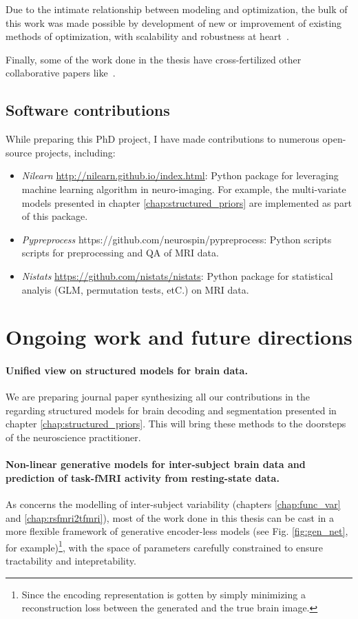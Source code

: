 Due to the intimate relationship between modeling and optimization, the
bulk of this work was made possible by development of new or improvement of existing methods of
optimization, with scalability and robustness at heart~\citep{dohmatob2014benchmarking,dohmatob2015local,varoquaux2015faasta,dohmatob2015simple}.

Finally, some of the work done in the thesis have cross-fertilized other collaborative papers like~\citep{rahim2015integrating,thirion2014fmri}.

\subsection{Software contributions}
While preparing this PhD project, I have made contributions to numerous open-source projects, including:
\begin{itemize}
\item \textit{Nilearn} \url{http://nilearn.github.io/index.html}: Python package for leveraging machine learning algorithm in neuro-imaging. For example, the multi-variate models presented in chapter \ref{chap:structured_priors} are implemented as part of this package.
\item \textit{Pypreprocess} https://github.com/neurospin/pypreprocess: Python scripts scripts for preprocessing and QA of MRI data.
\item \textit{Nistats} \url{https://github.com/nistats/nistats}: Python package for statistical analyis (GLM, permutation tests, etC.) on MRI data.
\end{itemize}
    

\section{Ongoing work and future directions}
\paragraph{Unified view on structured models for brain data.}
We are preparing journal paper synthesizing all our contributions in the regarding structured models for brain decoding and segmentation presented in chapter \ref{chap:structured_priors}. This will bring these methods to the doorsteps of the neuroscience practitioner.
\paragraph{Non-linear generative models for inter-subject brain data and prediction of task-fMRI activity from resting-state data.}
As concerns the modelling of inter-subject variability (chapters \ref{chap:func_var} and \ref{chap:rsfmri2tfmri}), most of the work done in this thesis can be cast in a more flexible framework of generative encoder-less models (see Fig. \ref{fig:gen_net}, for example)\footnote{Since the encoding representation is gotten by simply minimizing a reconstruction loss between the generated and the true brain image.}, with the space of parameters carefully constrained to ensure tractability and intepretability.
  



